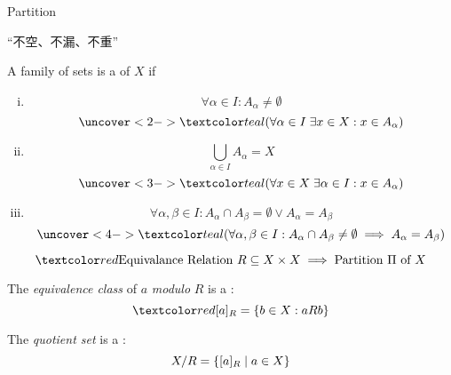 \begin{frame}{}
  \centerline{\LARGE Partition}

  \vspace{0.60cm}

  \begin{center}
    ``不空、不漏、不重''
  \end{center}
\end{frame}

\begin{frame}{}
  \begin{definition}[Partition]
    A family of sets  is a  of $X$ if

    \begin{enumerate}[(i)]
      \item 
	\[
	  \forall \alpha \in I: A_{\alpha} \neq \emptyset
	\]
	\[
	  \uncover<2->{\teal{(\forall \alpha \in I \; \exists x \in X: x \in A_{\alpha})}}
	\]
      \item 
	\[
	  \bigcup_{\alpha \in I} A_{\alpha} = X
	\]
	\[
	  \uncover<3->{\teal{(\forall x \in X \; \exists \alpha \in I: x \in A_{\alpha})}}
	\]
      \item 
	\[
	  \forall \alpha, \beta \in I: A_{\alpha} \cap A_{\beta} = \emptyset \lor A_{\alpha} = A_{\beta}
	\]
	\[
	  \uncover<4->{\teal{(\forall \alpha, \beta \in I: A_{\alpha} \cap A_{\beta} \neq \emptyset \implies A_{\alpha} = A_{\beta})}}
	\]
    \end{enumerate}
  \end{definition}
\end{frame}

\begin{frame}{}
  \[
    \red{\text{Equivalance Relation } R \subseteq X \times X \implies \text{Partition } \Pi \text{ of } X}
  \]

  \pause
  \begin{definition}
    The {\it equivalence class} of $a$ {\it modulo} $R$ is a :
    \[
      \red{[a]_{R}} = \set{b \in X: a R b}
    \]
  \end{definition}

  \pause
  \vspace{0.60cm}
  \begin{definition}
    The {\it quotient set} is a :
    \[
      X/R = \{[a]_{R} \mid a \in X\}
    \]
  \end{definition}
\end{frame}

